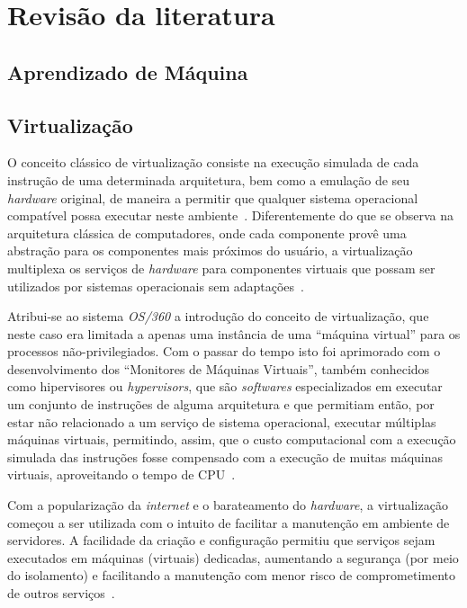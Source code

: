%
%

\chapter{Revisão da literatura}\label{sec:revisao}

\section{Aprendizado de Máquina}\label{sec:aprendizado}



\section{Virtualização}\label{sec:virt}

O conceito clássico de virtualização consiste na execução simulada de cada
instrução de uma determinada arquitetura, bem como a emulação de seu
\emph{hardware} original, de maneira a permitir que qualquer sistema operacional
compatível possa executar neste ambiente~\cite{goldberg1974survey}.
Diferentemente do que se observa na arquitetura clássica de computadores,
onde cada componente provê uma abstração para os componentes mais próximos do
usuário, a virtualização multiplexa os serviços de \emph{hardware} para
componentes virtuais que possam ser utilizados por sistemas operacionais
sem adaptações~\cite{dutra2009a}.


Atribui-se ao sistema \emph{OS/360} a introdução do conceito de
virtualização, que neste caso era limitada a apenas uma instância de uma
``máquina virtual'' para os processos não-privilegiados. Com o passar do
tempo isto foi aprimorado com o desenvolvimento dos ``Monitores de
Máquinas Virtuais'', também conhecidos como hipervisores ou
\emph{hypervisors}, que são \emph{softwares} especializados em executar um
conjunto de instruções de alguma arquitetura e que permitiam então, por
estar não relacionado a um serviço de sistema operacional, executar
múltiplas máquinas virtuais, permitindo, assim, que o custo computacional com
a execução simulada das instruções fosse compensado com a execução de
muitas máquinas virtuais, aproveitando o tempo de
CPU~\cite{goldberg1974survey}.

Com a popularização da \emph{internet} e o barateamento do \emph{hardware}, a
virtualização começou a ser utilizada com o intuito de facilitar a
manutenção em ambiente de servidores. A facilidade da criação e
configuração permitiu que serviços sejam executados em máquinas (virtuais)
dedicadas, aumentando a segurança (por meio do isolamento) e facilitando a
manutenção com menor risco de comprometimento de outros
serviços~\cite{smith2005architecture}.

